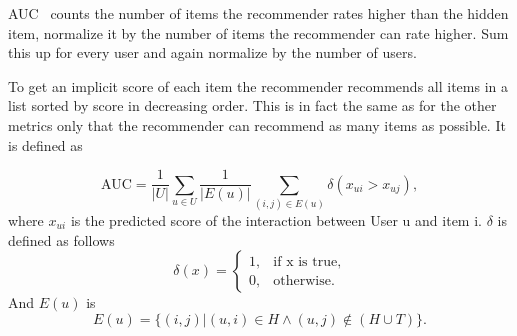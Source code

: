AUC~\cite{Rendle:2009:BBP:1795114.1795167} counts the number of items the recommender rates
higher than the hidden item, normalize it by the number of items the
recommender can rate higher. Sum this up for every user and again
normalize by the number of users.

To get an implicit score of each item the recommender recommends all
items in a list sorted by score in decreasing order. This is in fact the same
as for the other metrics only that the recommender can recommend as
many items as possible. It is defined as

\begin{equation}
\text{AUC}=\frac{1}{|U|}\sum_{u \in U} \frac{1}{|E(u)|} \sum_{(i,j) \in E(u)} \delta(x_{ui}>x_{uj}),
\end{equation}
where \(x_{ui}\) is the predicted score of the interaction between User u and item i.
\(\delta\) is defined as follows
\begin{equation}
\delta(x)=\begin{cases}1, & \text{if x is true}, \\
                       0, & \text{otherwise}.
\end{cases}
\end{equation}
And \(E(u)\) is 
\begin{equation}
E(u) =\{(i,j)|(u,i) \in H \land (u,j) \not\in (H \cup T)\}.
\end{equation}


%




